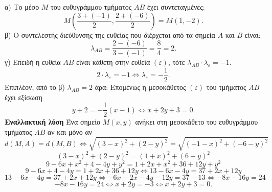 α) Το μέσο $M$ του ευθυγράμμου τμήματος $AB$ έχει συντεταγμένες:
\[ M\left(\frac{3+(-1)}{2}, \frac{2+(-6)}{2}\right) = M(1,-2). \]
β) Ο συντελεστής διεύθυνσης της ευθείας που διέρχεται από τα σημεία $A$ και $B$ είναι:
\[ \lambda_{AB} = \frac{2-(-6)}{3-(-1)} = \frac{8}{4} = 2. \]
γ) Επειδή η ευθεία $AB$ είναι κάθετη στην ευθεία $(\varepsilon)$, τότε $\lambda_{AB} \cdot \lambda_\varepsilon = -1$.
\[ 2 \cdot \lambda_\varepsilon = -1 \Leftrightarrow \lambda_\varepsilon = -\frac{1}{2}. \]
Επιπλέον, από το β) $\lambda_{AB} = 2$ άρα:
Επομένως η μεσοκάθετος $(\varepsilon)$ του τμήματος $AB$ έχει εξίσωση
\[ y+2 = -\frac{1}{2}(x-1) \Leftrightarrow x+2y+3 = 0. \]
\textbf{Εναλλακτική λύση}
Ένα σημείο $M(x,y)$ ανήκει στη μεσοκάθετο του ευθυγράμμου τμήματος $AB$ αν και μόνο αν
\[ d(M,A) = d(M,B) \Leftrightarrow \sqrt{(3-x)^2 + (2-y)^2} = \sqrt{(-1-x)^2 + (-6-y)^2} \]
\[ (3-x)^2 + (2-y)^2 = (1+x)^2 + (6+y)^2 \]
\[ 9-6x+x^2+4-4y+y^2 = 1+2x+x^2+36+12y+y^2 \]
\[ 9-6x+4-4y = 1+2x+36+12y \Leftrightarrow 13-6x-4y = 37+2x+12y \]
\[ 13-6x-4y = 37+2x+12y \Leftrightarrow -6x-2x-4y-12y = 37-13 \Leftrightarrow -8x-16y = 24 \]
\[ -8x-16y = 24 \Leftrightarrow x+2y = -3 \Leftrightarrow x+2y+3 = 0. \]